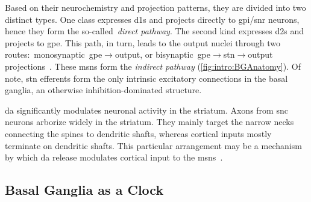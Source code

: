 Based on their neurochemistry and projection patterns, they are divided into two distinct types.
One class expresses \glspl{d1} and projects directly to \gls{gpi}/\gls{snr} neurons, hence they form the so-called~\emph{direct pathway}.
The second kind expresses \glspl{d2} and projects to \gls{gpe}.
This path, in turn, leads to the output nuclei through two routes:~monosynaptic~\gls{gpe}$\rightarrow$output, or bisynaptic~\gls{gpe}$\rightarrow$\gls{stn}$\rightarrow$output projections~\cite{TURNER2000BasalFunction}.
These \glspl{msn} form the \emph{indirect pathway} (\autoref{fig:intro:BGAnatomy}).
Of note, \gls{stn} efferents form the only intrinsic excitatory connections in the basal ganglia, an otherwise inhibition-dominated structure.
\par
\Gls{da} significantly modulates neuronal activity in the striatum.
Axons from \gls{snc} neurons arborize widely in the striatum.
They mainly target the narrow necks connecting the spines to dendritic shafts, whereas cortical inputs mostly terminate on dendritic shafts.
This particular arrangement may be a mechanism by which \gls{da} release modulates cortical input to the \glspl{msn}~\cite{TURNER2000BasalFunction}.


\subsection{Basal Ganglia as a Clock}
\label{ch:intro:BGTime}

